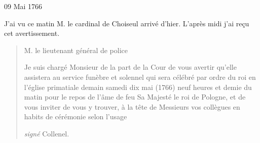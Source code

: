                      \begin{diary}{09 Mai 1766}{}
                        
                         J'ai vu ce matin M.
                              le cardinal de Choiseul
                           arrivé d'hier. L'après midi j'ai reçu cet
                           avertissement. \bigskip
        
        
                        \begin{quote}M. le lieutenant
                                    général de police\bigskip
                    
                    
                              Je suis chargé Monsieur de la part de la Cour
                              de vous avertir qu'elle assistera au service funèbre et solennel
                              qui sera célébré par ordre
                              du roi en l’église primatiale
                              demain samedi
                                 dix mai (1766) neuf heures et demie du matin
                              pour le repos de l'âme de feu Sa Majesté le roi de Pologne,
                              et de vous inviter de vous y trouver, à la tête de
                              Messieurs vos collègues en habits de cérémonie selon
                              l'usage \bigskip
        
        \begin{flushright}\emph{signé}
                                 Collenel.\end{flushright}\end{quote}
                     \end{diary}

